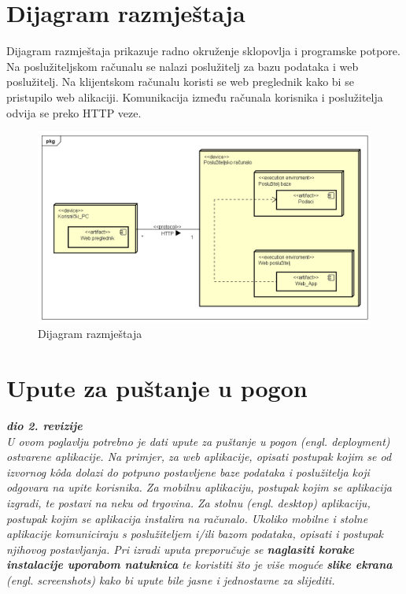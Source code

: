 			\eject 
		
		
		\section{Dijagram razmještaja}
			
			
			
			  \noindent Dijagram razmještaja prikazuje radno okruženje sklopovlja i programske potpore. Na poslužiteljskom računalu se nalazi poslužitelj za bazu podataka i web poslužitelj. Na klijentskom računalu koristi se web preglednik kako bi se pristupilo web alikaciji. Komunikacija između računala korisnika i poslužitelja odvija se preko HTTP veze.
			
			\begin{figure}[hp]
                    \centering
                    \includegraphics[width=16cm]{slike/Dijagram_razmjestaja.png}
                    \caption{Dijagram razmještaja}
                    \label{fig:DR_01}
                \end{figure}
			    
			\eject 
			
		
		\section{Upute za puštanje u pogon}
		
			\textbf{\textit{dio 2. revizije}}\\
		
			 \textit{U ovom poglavlju potrebno je dati upute za puštanje u pogon (engl. deployment) ostvarene aplikacije. Na primjer, za web aplikacije, opisati postupak kojim se od izvornog kôda dolazi do potpuno postavljene baze podataka i poslužitelja koji odgovara na upite korisnika. Za mobilnu aplikaciju, postupak kojim se aplikacija izgradi, te postavi na neku od trgovina. Za stolnu (engl. desktop) aplikaciju, postupak kojim se aplikacija instalira na računalo. Ukoliko mobilne i stolne aplikacije komuniciraju s poslužiteljem i/ili bazom podataka, opisati i postupak njihovog postavljanja. Pri izradi uputa preporučuje se \textbf{naglasiti korake instalacije uporabom natuknica} te koristiti što je više moguće \textbf{slike ekrana} (engl. screenshots) kako bi upute bile jasne i jednostavne za slijediti.}
			
